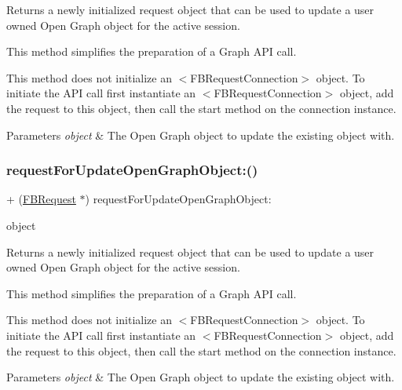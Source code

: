 Returns a newly initialized request object that can be used to update a user owned Open Graph object for the active session.

This method simplifies the preparation of a Graph A\+PI call.

This method does not initialize an $<$\+F\+B\+Request\+Connection$>$ object. To initiate the A\+PI call first instantiate an $<$\+F\+B\+Request\+Connection$>$ object, add the request to this object, then call the {\ttfamily start} method on the connection instance.


\begin{DoxyParams}{Parameters}
{\em object} & The Open Graph object to update the existing object with. \\
\hline
\end{DoxyParams}
\mbox{\label{interfaceFBRequest_ab92e50866d79923cfb17f1f96f06530b}} 
\subsubsection{\texorpdfstring{request\+For\+Update\+Open\+Graph\+Object\+:()}{requestForUpdateOpenGraphObject:()}\hspace{0.1cm}{\footnotesize\ttfamily [2/5]}}
{\footnotesize\ttfamily + (\hyperlink{interfaceFBRequest}{F\+B\+Request} $\ast$) request\+For\+Update\+Open\+Graph\+Object\+: \begin{DoxyParamCaption}\item[{(id$<$ \hyperlink{protocolFBOpenGraphObject-p}{F\+B\+Open\+Graph\+Object} $>$)}]{object }\end{DoxyParamCaption}}

Returns a newly initialized request object that can be used to update a user owned Open Graph object for the active session.

This method simplifies the preparation of a Graph A\+PI call.

This method does not initialize an $<$\+F\+B\+Request\+Connection$>$ object. To initiate the A\+PI call first instantiate an $<$\+F\+B\+Request\+Connection$>$ object, add the request to this object, then call the {\ttfamily start} method on the connection instance.


\begin{DoxyParams}{Parameters}
{\em object} & The Open Graph object to update the existing object with. \\
\hline
\end{DoxyParams}
\mbox{\label{interfaceFBRequest_ab92e50866d79923cfb17f1f96f06530b}} 
